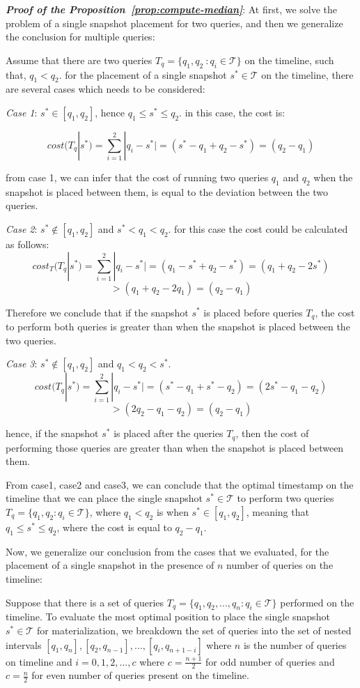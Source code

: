 \textbf{\emph{Proof of the Proposition~\ref{prop:compute-median}}}:
	At first, we solve the problem of a single snapshot placement for two queries, and then we generalize the conclusion for multiple queries:

	Assume that there are two queries $T_q=\{q_1,q_2\ : q_i \in \mathcal{T}\}$ on the timeline, such that, $q_1<q_2$. for the placement of a single snapshot $s^* \in \mathcal{T}$ on the timeline, there are several cases which needs to be considered:

	\emph{Case 1}:
	$s^* \in [q_1,q_2]$, hence $q_1\leq s^*\leq q_2$.
	in this case, the cost is:

	$$cost(T_q|s^*)=\sum_{i=1}^2|q_i-s^*| = (s^*-q_1+q_2-s^*)=(q_2-q_1)$$

	from case 1, we can infer that the cost of running two queries $q_1$ and $q_2$ when the snapshot is placed between them, is equal to the deviation between the two queries.

	\emph{Case 2}:
	$s^* \notin [q_1,q_2]$ and $s^* < q_1 < q_2$. for this case the cost could be calculated as follows:
	$$cost_T(T_q|s^*)=\sum_{i=1}^2|q_i-s^*| = (q_1-s^*+q_2-s^*)=(q_1+q_2-2s^*) $$$$>(q_1+q_2-2q_1)=(q_2-q_1)$$

	Therefore we conclude that if the snapshot $s^*$ is placed before queries $T_q$, the cost to perform both queries is greater than when the snapshot is placed between the two queries.

	\emph{Case 3}:
	$s^* \notin [q_1,q_2]$ and $q_1 < q_2 < s^*$.
	$$cost(T_q|s^*)=\sum_{i=1}^2|q_i-s^*| = (s^*-q_1+s^*-q_2)=(2s^*-q_1-q_2) $$$$>(2q_2-q_1-q_2)=(q_2-q_1)$$

	hence, if the snapshot $s^*$ is placed after the queries $T_q$, then the cost of performing those queries are greater than when the snapshot is placed between them.

	From case1, case2 and case3, we can conclude that the optimal timestamp on the timeline that we can place the single snapshot $s^* \in \mathcal{T}$ to perform two queries $T_q = \{q_1,q_2:q_i\in \mathcal{T}\}$, where $q_1<q_2$ is when $s^* \in [q_1,q_2]$, meaning that $q_1 \leq s^* \leq q_2$, where the cost is equal to $q_2-q_1$.

	Now, we generalize our conclusion from the cases that we evaluated, for the placement of a single snapshot in the presence of $n$ number of queries on the timeline: 

	Suppose that there is a set of queries $T_q=\{q_1,q_2,...,q_n:q_i \in \mathcal{T}\}$ performed on the timeline. To evaluate the most optimal position to place the single snapshot $s^* \in \mathcal{T}$ for materialization, we breakdown the set of queries into the set of nested intervals $[q_1,q_n],[q_2,q_{n-1}],...,[q_i,q_{n+1-i}]$ where $n$ is the number of queries on timeline and $i=0,1,2,...,c$ where $c=\frac{n+1}{2}$ for odd number of queries and $c=\frac{n}{2}$ for even number of queries present on the timeline.

